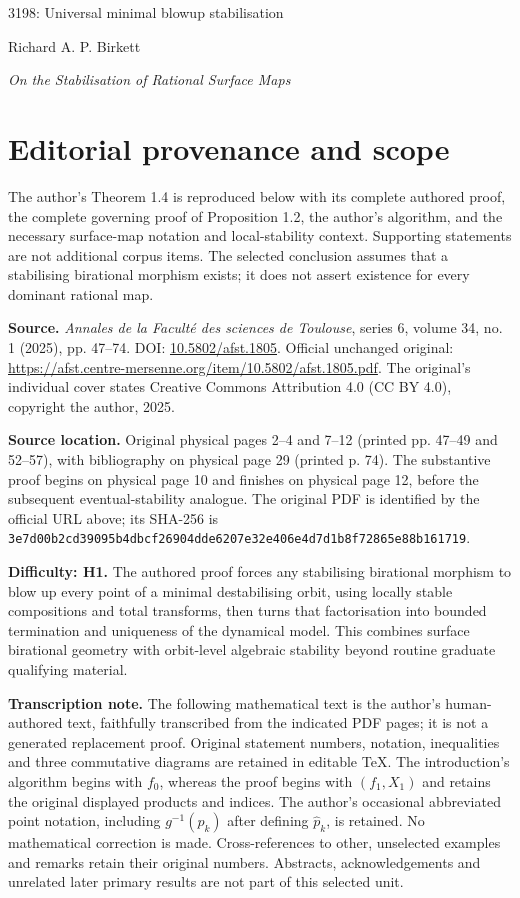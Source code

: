 \documentclass[11pt]{article}
\begin{document}
\begin{center}
 {\Large 3198: Universal minimal blowup stabilisation}\par\medskip
 {\large Richard A. P. Birkett}\par
 \emph{On the Stabilisation of Rational Surface Maps}
\end{center}

\section*{Editorial provenance and scope}
The author's Theorem 1.4 is reproduced below with its complete authored
proof, the complete governing proof of Proposition 1.2, the author's
algorithm, and the necessary surface-map notation and local-stability
context. Supporting statements are not additional corpus items. The
selected conclusion assumes that a stabilising birational morphism exists;
it does not assert existence for every dominant rational map.

\noindent\textbf{Source.} \emph{Annales de la Faculté des sciences de Toulouse},
series 6, volume 34, no. 1 (2025), pp. 47--74.
DOI: \href{https://doi.org/10.5802/afst.1805}{10.5802/afst.1805}.
Official unchanged original:
\url{https://afst.centre-mersenne.org/item/10.5802/afst.1805.pdf}.
The original's individual cover states Creative Commons Attribution 4.0
(CC BY 4.0), copyright the author, 2025.

\noindent\textbf{Source location.} Original physical pages 2--4 and 7--12
(printed pp. 47--49 and 52--57), with bibliography on physical page 29
(printed p. 74). The substantive proof begins on physical page 10 and
finishes on physical page 12, before the subsequent eventual-stability
analogue. The original PDF is identified by the official URL above; its SHA-256 is
\texttt{3e7d00b2cd39095b4dbcf26904dde6207e32e406e4d7d1b8f72865e88b161719}.

\noindent\textbf{Difficulty: H1.} The authored proof forces any stabilising
birational morphism to blow up every point of a minimal destabilising orbit,
using locally stable compositions and total transforms, then turns that
factorisation into bounded termination and uniqueness of the dynamical
model. This combines surface birational geometry with orbit-level algebraic
stability beyond routine graduate qualifying material.

\noindent\textbf{Transcription note.} The following mathematical text is
the author's human-authored text, faithfully transcribed from the indicated
PDF pages; it is not a generated replacement proof. Original statement
numbers, notation, inequalities and three commutative diagrams are retained
in editable TeX. The introduction's algorithm begins with $f_0$, whereas
the proof begins with $(f_1,X_1)$ and retains the original displayed products
and indices. The author's occasional abbreviated point notation, including
$g^{-1}(p_k)$ after defining $\widehat p_k$, is retained. No mathematical
correction is made. Cross-references to other, unselected examples and
remarks retain their original numbers. Abstracts, acknowledgements and
unrelated later primary results are not part of this selected unit.
\end{document}

